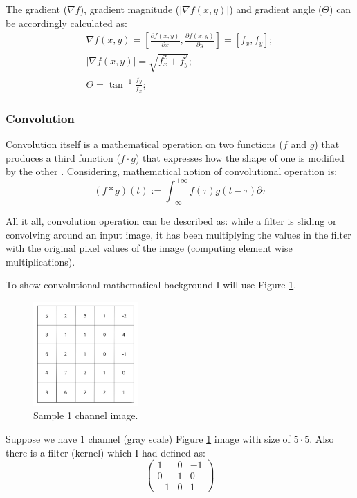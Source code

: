 The gradient ($\nabla f$), gradient magnitude ($|\nabla f(x, y)|$) and gradient angle ($\Theta$) can be accordingly calculated as: 
\begin{align*}
\nabla f(x, y) = \left[ \frac{\partial{f (x, y)}}{\partial{x}}, \frac{\partial{f (x, y)}}{\partial{y}} \right]  = [f_x, f_y]; \\
|\nabla f(x, y)| = \sqrt{f^2_x + f^2_y}; \\
\Theta = \tan^{-1} \frac{f_y}{f_x};
\end{align*}

\subsubsection{Convolution}
Convolution itself is a mathematical operation on two functions ($f$ and $g$) that produces a third function ($f \cdot g$) that expresses how the shape of one is modified by the other \cite{Pang2018}. Considering, mathematical notion of convolutional operation is:
\[(f \ast g)(t) := \int_{-\infty}^{+\infty} f(\tau)g(t - \tau)\partial\tau \]

All it all, convolution operation can be described as: while a filter is sliding or convolving around an input image, it has been multiplying the values in the filter with the original pixel values of the image (computing element wise multiplications).


To show convolutional mathematical background I will use Figure \ref{fig:sample_1_channel_image}.   
\begin{figure}[h]
    \centering \includegraphics[width=4cm]{images/1_channel.jpg}
    \caption {Sample 1 channel image.}
    \label {fig:sample_1_channel_image}
\end{figure}

Suppose we have 1 channel (gray scale) Figure \ref{fig:sample_1_channel_image} image with size of $5 \cdot 5$. Also there is a filter (kernel) which I had defined as: 
\[ \begin{pmatrix} 1 & 0 & -1 \\ 0 & 1 & 0 \\ -1 & 0 & 1 \end{pmatrix} \]

